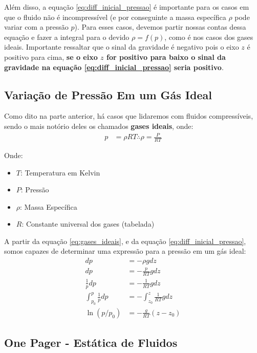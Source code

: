 \documentclass{article}
\newcommand{\n}{\nonumber \\ }
\begin{document}
Além disso, a equação \ref{eq:diff_inicial_pressao} é importante para os casos em que o fluido não é incompressível (e por conseguinte a massa específica $\rho$ pode variar com a pressão
$p$). Para esses casos, devemos partir nossas contas dessa equação e fazer a integral para o devido $\rho = f(p)$, como é nos casos dos gases ideais. Importante ressaltar que o sinal da
gravidade é negativo pois o eixo $z$ é positivo para cima, \textbf{se o eixo $z$ for positivo para baixo o sinal da gravidade na equação \ref{eq:diff_inicial_pressao} seria positivo}.


\newpage

\subsection{Variação de Pressão Em um Gás Ideal}
Como dito na parte anterior, há casos que lidaremos com fluidos compressíveis, sendo o mais notório deles os chamados \textbf{gases ideais}, onde:
\begin{align}
    p & = \rho RT \therefore \rho = \frac{P}{RT} \label{eq:gases_ideais}
\end{align}

Onde:
\begin{itemize}
    \item $T$: Temperatura em Kelvin
    \item $P$: Pressão
    \item $\rho$: Massa Específica
    \item $R$: Constante universal dos gases (tabelada)
\end{itemize}

A partir da equação \ref{eq:gases_ideais}, e da equação \ref{eq:diff_inicial_pressao}, somos capazes de determinar uma expressão para a pressão em um gás ideal:
\begin{align}
    dp                         & = - \rho g dz \n
    dp                         & = - \frac{p}{RT} g dz \n
    \frac{1}{p} dp             & = -\frac{1}{RT} g dz \n
    \int^p_{p_0}\frac{1}{p} dp & = -\int^z_{z_0}\frac{1}{RT} g dz \n
    \ln{(p/p_0)}               & = -\frac{g}{RT} (z - z_0)
\end{align}

\newpage

\subsection{One Pager - Estática de Fluidos}
\end{document}
